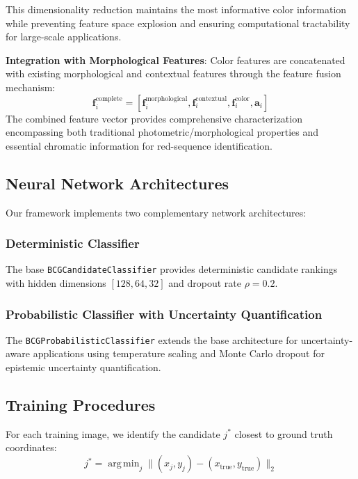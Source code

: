 \documentclass[twocolumn,10pt]{aastex631}
\DeclareMathOperator*{\argmin}{arg\,min}
\begin{document}
This dimensionality reduction maintains the most informative color information while preventing feature space explosion and ensuring computational tractability for large-scale applications.

\textbf{Integration with Morphological Features}: Color features are concatenated with existing morphological and contextual features through the feature fusion mechanism:
\begin{equation}
\mathbf{f}_i^{\text{complete}} = [\mathbf{f}_i^{\text{morphological}}, \mathbf{f}_i^{\text{contextual}}, \mathbf{f}_i^{\text{color}}, \mathbf{a}_i]
\end{equation}
The combined feature vector provides comprehensive characterization encompassing both traditional photometric/morphological properties and essential chromatic information for red-sequence identification.

\subsection{Neural Network Architectures}

Our framework implements two complementary network architectures:

\subsubsection{Deterministic Classifier}
The base \texttt{BCGCandidateClassifier} provides deterministic candidate rankings with hidden dimensions $[128, 64, 32]$ and dropout rate $\rho = 0.2$.

\subsubsection{Probabilistic Classifier with Uncertainty Quantification}
The \texttt{BCGProbabilisticClassifier} extends the base architecture for uncertainty-aware applications using temperature scaling and Monte Carlo dropout for epistemic uncertainty quantification.

\subsection{Training Procedures}

For each training image, we identify the candidate $j^*$ closest to ground truth coordinates:
\begin{equation}
j^* = \argmin_j \|(x_j, y_j) - (x_{\text{true}}, y_{\text{true}})\|_2
\end{equation}
\end{document}
